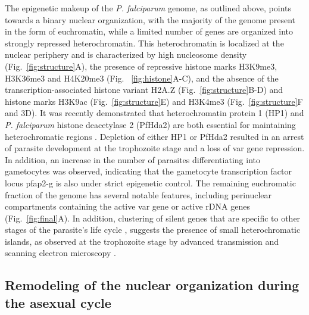 The epigenetic makeup of the \textit{P. falciparum} genome, as outlined above, points
towards a binary nuclear organization, with the majority of the genome present
in the form of euchromatin, while a limited number of genes are organized into
strongly repressed heterochromatin. This heterochromatin is localized at the
nuclear periphery and is characterized by high nucleosome density
(Fig.~\ref{fig:structure}A),
the presence of repressive histone marks H3K9me3, H3K36me3 and H4K20me3 (Fig.
~\ref{fig:histone}A-C), and the absence of the transcription-associated histone variant H2A.Z
(Fig.~\ref{fig:structure}B-D) and histone marks H3K9ac (Fig.~\ref{fig:structure}E) and H3K4me3
(Fig.~\ref{fig:structure}F and 3D).
It was recently demonstrated that heterochromatin protein 1 (HP1) and \textit{P.
falciparum} histone deacetylase 2 (PfHda2) are both essential for maintaining
heterochromatic regions \citep{brancucci:heterochromatin, coleman:plasmodium}.
Depletion of either HP1 or PfHda2 resulted in
an arrest of parasite development at the trophozoite stage and a loss of var
gene repression. In addition, an increase in the number of parasites
differentiating into gametocytes was observed, indicating that the gametocyte
transcription factor locus pfap2-g is also under strict epigenetic control.
The remaining euchromatic fraction of the genome has several notable features,
including perinuclear compartments containing the active var gene or active
rDNA genes (Fig.~\ref{fig:final}A). In addition, clustering of silent genes that are
specific to other stages of the parasite’s life cycle
\citep{ay:three-dimensional}, suggests the
presence of small heterochromatic islands, as observed at the trophozoite
stage by advanced transmission and scanning electron microscopy
\citep{weiner:3d}.

\subsection{Remodeling of the nuclear organization during the asexual cycle}

